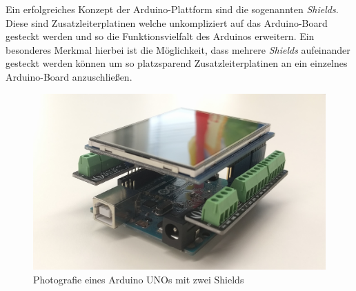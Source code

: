 Ein erfolgreiches Konzept der Arduino-Plattform sind die sogenannten \textit{Shields}.
Diese sind Zusatzleiterplatinen welche unkompliziert auf das Arduino-Board gesteckt werden und so die Funktionsvielfalt des Arduinos erweitern.
Ein besonderes Merkmal hierbei ist die Möglichkeit, dass mehrere \textit{Shields} aufeinander gesteckt werden können um so platzsparend Zusatzleiterplatinen an ein einzelnes Arduino-Board anzuschließen.
\begin{figure}[H]
	\centering
	\includegraphics[width=12cm]{images/chapter/02/arduino_shields.jpg}
	\caption{Photografie eines Arduino UNOs mit zwei Shields}
	\label{fig:arduino_shield}
\end{figure}
